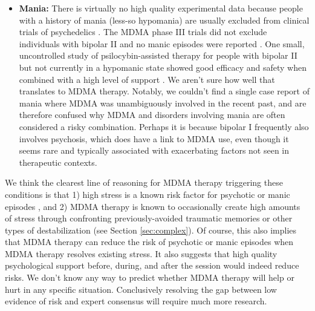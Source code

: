\documentclass[12pt,letterpaper]{book}
\begin{document}
\begin{itemize}
\begin{itemize}
            \item \textbf{Mania:} There is virtually no high quality experimental data because people with a history of mania (less-so hypomania) are usually excluded from clinical trials of psychedelics \cite{gardBipolar}. The MDMA phase III trials did not exclude individuals with bipolar II and no manic episodes were reported \cite{mitchellMDMAClinicalTrial2}. One small, uncontrolled study of psilocybin-assisted therapy for people with bipolar II but not currently in a hypomanic state showed good efficacy and safety when combined with a high level of support \cite{aaronsonBipolarII}. We aren't sure how well that translates to MDMA therapy. Notably, we couldn't find a single case report of mania where MDMA was unambiguously involved in the recent past, and are therefore confused why MDMA and disorders involving mania are often considered a risky combination. Perhaps it is because bipolar I frequently also involves psychosis, which does have a link to MDMA use, even though it seems rare and typically associated with exacerbating factors not seen in therapeutic contexts.
        \end{itemize}
     We think the clearest line of reasoning for MDMA therapy triggering these conditions is that 1) high stress is a known risk factor for psychotic or manic episodes \cite{winkelPsychosisStress,Umeoka2021stressmania}, and 2) MDMA therapy is known to occasionally create high amounts of stress through confronting previously-avoided traumatic memories or other types of destabilization (see Section \ref{sec:complex}). Of course, this also implies that MDMA therapy can reduce the risk of psychotic or manic episodes when MDMA therapy resolves existing stress. It also suggests that high quality psychological support before, during, and after the session would indeed reduce risks. We don't know any way to predict whether MDMA therapy will help or hurt in any specific situation. Conclusively resolving the gap between low evidence of risk and expert consensus will require much more research.
\end{itemize}
\end{document}
